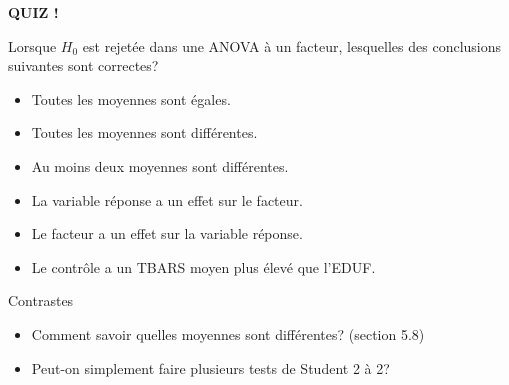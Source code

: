 \documentclass{BeamerTemplate}
\begin{document}
\begin{frame}[plain,t]
  \centerline{\LARGE\bfseries\alert{QUIZ !}}

  \medskip
  Lorsque $H_0$ est rejetée dans une ANOVA à un facteur, lesquelles des conclusions
  suivantes sont correctes?
  \begin{itemize}\itemsep 0.45cm
    \item Toutes les moyennes sont égales.
    \item Toutes les moyennes sont différentes.
    \item Au moins deux moyennes sont différentes.
    \item La variable réponse a un effet sur le facteur.
    \item Le facteur a un effet sur la variable réponse.
    \item Le contrôle a un TBARS moyen plus élevé que l'EDUF.
  \end{itemize}
\end{frame}

\begin{frame}[t]{Contrastes}

\begin{itemize}\itemsep8mm
  \item Comment savoir \alert{quelles} moyennes sont différentes? (section 5.8)
  \vspace{1.5cm}
  \item Peut-on simplement faire plusieurs tests de Student 2 à 2?
  \vspace{1.5cm}
\end{itemize}

\end{frame}
\end{document}
